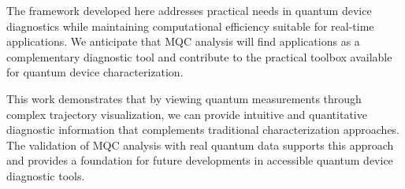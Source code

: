 The framework developed here addresses practical needs in quantum device diagnostics while maintaining computational efficiency suitable for real-time applications. We anticipate that MQC analysis will find applications as a complementary diagnostic tool and contribute to the practical toolbox available for quantum device characterization.

This work demonstrates that by viewing quantum measurements through complex trajectory visualization, we can provide intuitive and quantitative diagnostic information that complements traditional characterization approaches. The validation of MQC analysis with real quantum data supports this approach and provides a foundation for future developments in accessible quantum device diagnostic tools.